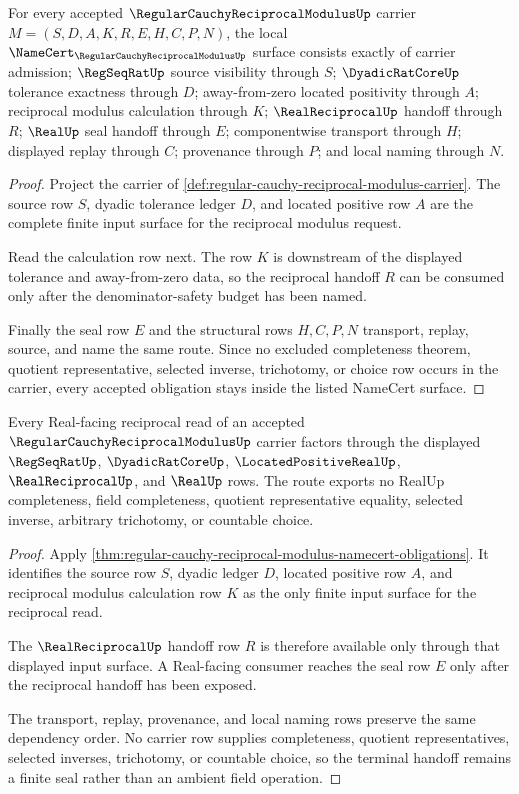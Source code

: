 \begin{theorem}
\label{thm:regular-cauchy-reciprocal-modulus-namecert-obligations}
For every accepted $\RegularCauchyReciprocalModulusUp$ carrier $M=(S,D,A,K,R,E,H,C,P,N)$, the local $\NameCert_{\RegularCauchyReciprocalModulusUp}$ surface consists exactly of carrier admission; $\RegSeqRatUp$ source visibility through $S$; $\DyadicRatCoreUp$ tolerance exactness through $D$; away-from-zero located positivity through $A$; reciprocal modulus calculation through $K$; $\RealReciprocalUp$ handoff through $R$; $\RealUp$ seal handoff through $E$; componentwise transport through $H$; displayed replay through $C$; provenance through $P$; and local naming through $N$.
\end{theorem}
\begin{proof}
Project the carrier of \autoref{def:regular-cauchy-reciprocal-modulus-carrier}. The source row $S$, dyadic tolerance ledger $D$, and located positive row $A$ are the complete finite input surface for the reciprocal modulus request.

Read the calculation row next. The row $K$ is downstream of the displayed tolerance and away-from-zero data, so the reciprocal handoff $R$ can be consumed only after the denominator-safety budget has been named.

Finally the seal row $E$ and the structural rows $H,C,P,N$ transport, replay, source, and name the same route. Since no excluded completeness theorem, quotient representative, selected inverse, trichotomy, or choice row occurs in the carrier, every accepted obligation stays inside the listed NameCert surface.
\end{proof}

\begin{theorem}
\label{thm:regular-cauchy-reciprocal-modulus-real-seal-boundary}
Every Real-facing reciprocal read of an accepted $\RegularCauchyReciprocalModulusUp$ carrier factors through the displayed $\RegSeqRatUp$, $\DyadicRatCoreUp$, $\LocatedPositiveRealUp$, $\RealReciprocalUp$, and $\RealUp$ rows. The route exports no RealUp completeness, field completeness, quotient representative equality, selected inverse, arbitrary trichotomy, or countable choice.
\end{theorem}
\begin{proof}
Apply \autoref{thm:regular-cauchy-reciprocal-modulus-namecert-obligations}. It identifies the source row $S$, dyadic ledger $D$, located positive row $A$, and reciprocal modulus calculation row $K$ as the only finite input surface for the reciprocal read.

The $\RealReciprocalUp$ handoff row $R$ is therefore available only through that displayed input surface. A Real-facing consumer reaches the seal row $E$ only after the reciprocal handoff has been exposed.

The transport, replay, provenance, and local naming rows preserve the same dependency order. No carrier row supplies completeness, quotient representatives, selected inverses, trichotomy, or countable choice, so the terminal handoff remains a finite seal rather than an ambient field operation.
\end{proof}

